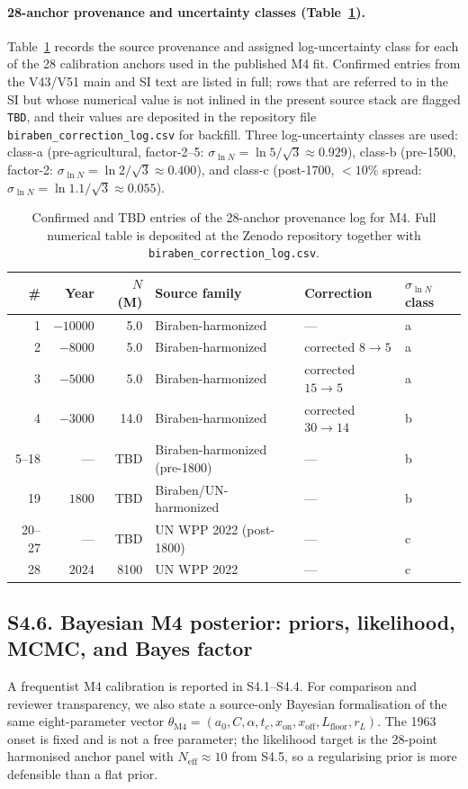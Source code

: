 \documentclass[11pt]{article}
\begin{document}
\paragraph{28-anchor provenance and uncertainty classes (Table~\ref{tab:S_prov}).}
Table~\ref{tab:S_prov} records the source provenance and assigned log-uncertainty class for each of the 28 calibration anchors used in the published M4 fit.  Confirmed entries from the V43/V51 main and SI text are listed in full; rows that are referred to in the SI but whose numerical value is not inlined in the present source stack are flagged \texttt{TBD}, and their values are deposited in the repository file \texttt{biraben\_correction\_log.csv} for backfill.  Three log-uncertainty classes are used: class-a (pre-agricultural, factor-2--5: $\sigma_{\ln N}=\ln 5/\sqrt 3\approx 0.929$), class-b (pre-1500, factor-2: $\sigma_{\ln N}=\ln 2/\sqrt 3\approx 0.400$), and class-c (post-1700, $<10\%$ spread: $\sigma_{\ln N}=\ln 1.1/\sqrt 3\approx 0.055$).
\begin{table}[H]
\centering
\caption{Confirmed and TBD entries of the 28-anchor provenance log for M4.  Full numerical table is deposited at the Zenodo repository together with \texttt{biraben\_correction\_log.csv}.}
\label{tab:S_prov}
\small
\begin{tabular}{rrrlll}
\toprule
\# & Year & $N$ (M) & Source family & Correction & $\sigma_{\ln N}$ class \\
\midrule
1  & $-10000$ & 5.0 & Biraben-harmonized & --- & a \\
2  & $-8000$ & 5.0 & Biraben-harmonized & corrected $8\to 5$ & a \\
3  & $-5000$ & 5.0 & Biraben-harmonized & corrected $15\to 5$ & a \\
4  & $-3000$ & 14.0 & Biraben-harmonized & corrected $30\to 14$ & b \\
5--18 & --- & TBD & Biraben-harmonized (pre-1800) & --- & b \\
19 & $1800$ & TBD & Biraben/UN-harmonized & --- & b \\
20--27 & --- & TBD & UN WPP 2022 (post-1800) & --- & c \\
28 & $2024$ & 8100 & UN WPP 2022 & --- & c \\
\bottomrule
\end{tabular}
\end{table}

\pagebreak

\subsection*{S4.6. Bayesian M4 posterior: priors, likelihood, MCMC, and Bayes factor}
\label{subsec:S4_6_bayesian}
A frequentist M4 calibration is reported in S4.1--S4.4.  For comparison and reviewer transparency, we also state a source-only Bayesian formalisation of the same eight-parameter vector $\theta_{\mathrm{M4}}=(a_0,C,\alpha,t_c,x_{\mathrm{on}},x_{\mathrm{off}},L_{\mathrm{floor}},r_L)$.  The 1963 onset is fixed and is not a free parameter; the likelihood target is the 28-point harmonised anchor panel with $N_{\mathrm{eff}}\approx 10$ from S4.5, so a regularising prior is more defensible than a flat prior.
\end{document}
